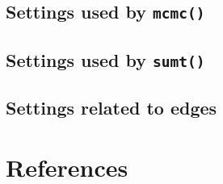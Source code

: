 \documentclass[10pt]{article}
\newcommand{\code}[1]{{\tt #1}}
\begin{document}
\subsection{Settings used by \code{mcmc()}}\label{subsec:mcmcsettings}


\subsection{Settings used by \code{sumt()}}\label{subsec:sumtsettings}


\subsection{Settings related to edges}\label{subsec:edgesettings}


%
%

\section{References}
\renewcommand{\bibsection}{}


\printindex
\end{document}
